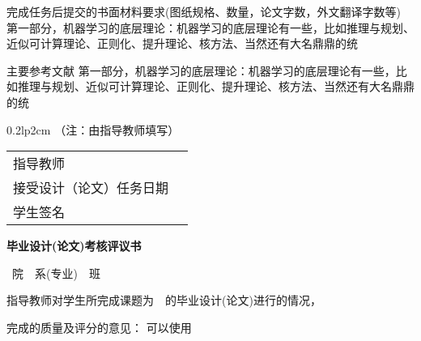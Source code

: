 \begin{ulfield2}[6]{完成任务后提交的书面材料要求(图纸规格、数量，论文字数，外文翻译字数等)}
第一部分，机器学习的底层理论：机器学习的底层理论有一些，比如推理与规划、近似可计算理论、正则化、提升理论、核方法、当然还有大名鼎鼎的统
\end{ulfield2}

\begin{ulfield2}[6]{主要参考文献}
第一部分，机器学习的底层理论：机器学习的底层理论有一些，比如推理与规划、近似可计算理论、正则化、提升理论、核方法、当然还有大名鼎鼎的统
\end{ulfield2}


\vspace{2.5em}
\begin{minipage}[t]{1\linewidth} 
\begin{tabular*}{0.2\linewidth}{lp{2cm}}
（注：由指导教师填写）
\end{tabular*}
\hskip 5cm
\begin{tabular*}{0.2\linewidth}{lp{2cm}}
指导教师&\\
接受设计（论文）任务日期&\\
学生签名 &\\ 
\end{tabular*}
 \end{minipage}
 
 
 
 
 

 


\newpage

\ccwd
\begin{center}
\bfseries {}
\end{center}

\begin{center}
\huge\bfseries
毕业设计(论文)考核评议书
\vspace{\ccwd}
\end{center}
\par\noindent\myunderline[10]{\@college}~院~\myunderline[10]{\@department}~系(专业)~\myunderline[8]{\@class}~班
\vspace{2\ccwd}

指导教师对学生\myunderline[10]{\@student}所完成课题为~\CJKunderline*{\@yourtitle}~的毕业设计(论文)进行的情况，
\begin{ulfield1}[5]{完成的质量及评分的意见：}
可以使用
\end{ulfield1}


